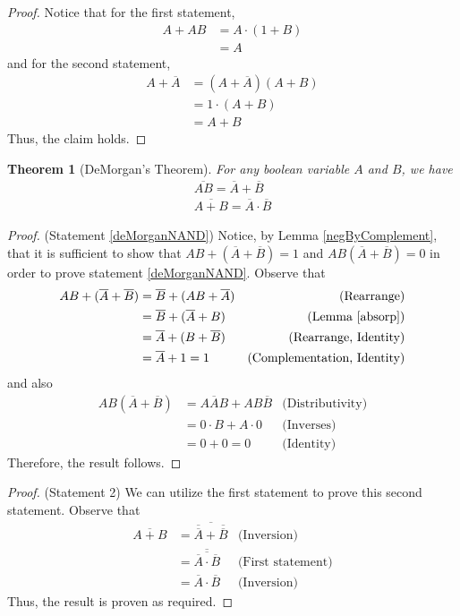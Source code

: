 \documentclass{report}
\newtheorem{theorem}{Theorem}
\begin{document}
	\begin{proof}
		Notice that for the first statement,
		\begin{align*}
			A + AB &= A \cdot (1 + B) \\
			&= A
		\end{align*}
		and for the second statement,
		\begin{align*}
			A + \overline{A} &= (A + \overline{A})(A + B) \\
			&= 1 \cdot (A + B) \\
			&= A + B
		\end{align*}
		Thus, the claim holds.
	\end{proof}
	
	\begin{theorem}[DeMorgan's Theorem]
		For any boolean variable $A$ and $B$, we have
		\begin{align}
			\overline{AB} = \overline{A} + \overline{B} \label{deMorganNAND} \\
			\overline{A+B} = \overline{A} \cdot \overline{B} \label{deMorganNOR}
		\end{align}
	\end{theorem}
	
	\begin{proof} (Statement \ref{deMorganNAND}) 
		Notice, by Lemma \ref{negByComplement}, that it is sufficient to show that $AB + (\overline{A} + \overline{B}) = 1$ and $AB(\overline{A} + \overline{B}) = 0$ in order to prove statement \ref{deMorganNAND}. Observe that
		\begin{align*}
			AB + (\overline{A} + \overline{B}) &= \overline{B} + (AB + \overline{A}) &\text{(Rearrange)}\\
			&= \overline{B} + (\overline{A} + B) &\text{(Lemma \ref{absorp})} \\
			&= \overline{A} + (B + \overline{B}) &\text{(Rearrange, Identity)}\\
			&= \overline{A} + 1 = 1 &\text{(Complementation, Identity)}
		\end{align*}
		and also
		\begin{align*}
			AB(\overline{A} + \overline{B}) &= A\overline{A}B + AB\overline{B} &\text{(Distributivity)} \\
			&= 0 \cdot B + A \cdot 0 &\text{(Inverses)} \\
			&= 0 + 0 = 0 &\text{(Identity)}
		\end{align*}
		Therefore, the result follows.
	\end{proof}
	
	\begin{proof} (Statement 2)
		We can utilize the first statement to prove this second statement. Observe that
		\begin{align*}
			\overline{A+B} &= \overline{\overline{\overline{A}} + \overline{\overline{B}}} &\text{(Inversion)}\\
			&= \overline{\overline{\overline{A} \cdot \overline{B}}} &\text{(First statement)} \\
			&= \overline{A} \cdot \overline{B} &\text{(Inversion)}
		\end{align*}
		Thus, the result is proven as required.
	\end{proof}
	
\end{document}
